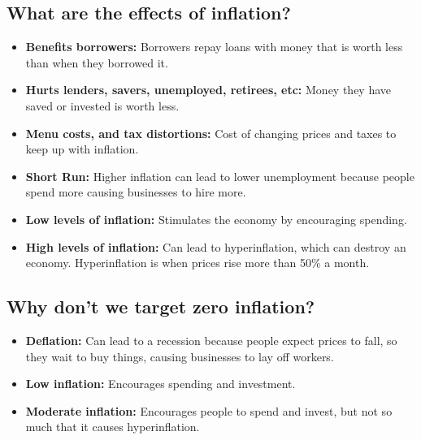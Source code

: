 \subsection{What are the effects of inflation?}
\begin{definition}
    \begin{itemize}
        \item \textbf{Benefits borrowers:} Borrowers repay loans with money that is worth less than when they borrowed it.
        \item \textbf{Hurts lenders, savers, unemployed, retirees, etc:} Money they have saved or invested is worth less.
        \item \textbf{Menu costs, and tax distortions:} Cost of changing prices and taxes to keep up with inflation.
        \item \textbf{Short Run:} Higher inflation can lead to lower unemployment because people spend more causing businesses to hire more.
        \item \textbf{Low levels of inflation:} Stimulates the economy by encouraging spending.
        \item \textbf{High levels of inflation:} Can lead to hyperinflation, which can destroy an economy. Hyperinflation is when prices rise more than 50\% a month.
    \end{itemize}
\end{definition}

\subsection{Why don't we target zero inflation?}
\begin{intuition}
    \begin{itemize}
        \item \textbf{Deflation:} Can lead to a recession because people expect prices to fall, so they wait to buy things, causing businesses to lay off workers.
        \item \textbf{Low inflation:} Encourages spending and investment.
        \item \textbf{Moderate inflation:} Encourages people to spend and invest, but not so much that it causes hyperinflation.
    \end{itemize}
\end{intuition}

